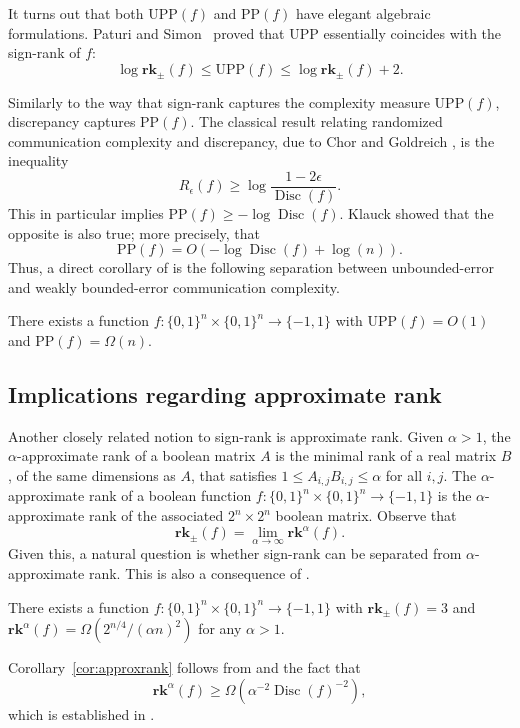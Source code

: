 \documentclass{toc}
\DeclareMathOperator{\Disc}{Disc}
\newcommand{\srk}{\mathbf{rk}_{\pm}}   %
\newcommand{\rk}{\mathbf{rk}}          %
\newcommand{\UPP}{\mathrm{UPP}}
\newcommand{\calPP}{\mathrm{PP}}
\begin{document}
It turns out that both $\UPP(f)$ and $\calPP(f)$  have elegant algebraic formulations. Paturi and Simon~\cite{paturi1986probabilistic} proved that $\UPP$ essentially coincides with the sign-rank of $f$:
$$\log \srk (f) \le \UPP(f) \le \log \srk (f)+2.$$

%
Similarly  %
to the way that sign-rank captures the complexity measure $\UPP(f)$, discrepancy captures $\calPP(f)$. The classical result relating randomized communication complexity and discrepancy, due to Chor and Goldreich  \cite{chor1988unbiased}, is the inequality
%
$$
R_{\epsilon}(f) \ge \log  \frac{1-2 \epsilon}{\Disc(f)}.
$$
This in particular implies $\calPP(f) \ge  -\log\Disc(f)$.
Klauck \cite{klauck2001lower}  showed that the opposite is also true; more precisely, that
$$\calPP(f)=O\left( - \log \Disc(f) + \log(n)\right). $$
Thus, a direct corollary of  is the following separation between unbounded-error and weakly bounded-error communication complexity.

\begin{corollary}\label{cor:separation}
There exists a  function $f:\{0,1\}^n \times \{0,1\}^n \to \{-1,1\}$ with $\UPP(f) = O(1)$ and $\calPP(f) = \Omega(n)$.
\end{corollary}



\subsection{Implications regarding approximate rank}
Another closely related notion to sign-rank is approximate rank. Given $\alpha > 1$, the $\alpha$-approximate rank of a boolean matrix $A$
is the minimal rank of a real matrix $B$, of the same dimensions as $A$, that satisfies $1 \le A_{i,j} B_{i,j} \le \alpha$ for all $i,j$.
The $\alpha$-approximate rank of a boolean function $f:\{0,1\}^n \times \{0,1\}^n \to \{-1,1\}$ is the $\alpha$-approximate rank of the associated $2^n \times 2^n$ boolean matrix. Observe that
$$\srk(f) = \lim_{\alpha\to\infty} \rk^\alpha(f).$$
Given this, a natural question is whether sign-rank can be separated from $\alpha$-approximate rank.
%
This is also a consequence of .
\begin{corollary}\label{cor:approxrank}
There exists a  function $f:\{0,1\}^n \times \{0,1\}^n \to \{-1,1\}$ with $\srk(f) = 3$ and $\rk^{\alpha}(f) = \Omega(2^{n/4} / (\alpha n)^2)$ for any $\alpha> 1$.
\end{corollary}
Corollary~\ref{cor:approxrank} follows from  and the fact that
$$\rk^{\alpha}(f) \geq \Omega\left(\alpha^{-2}\Disc(f)^{-2}\right),$$
which is established in %
\cite[Equation (1)]{gal-syed}.
\end{document}
